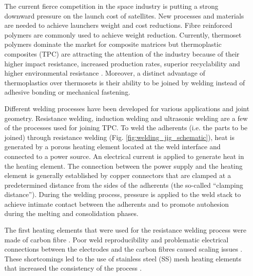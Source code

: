 \documentclass[11pt,review,times]{elsarticle}
\begin{document}
The current fierce competition in the space industry is putting a strong downward pressure on the launch cost of satellites. 
New processes and materials are needed to achieve launchers weight and cost reductions. 
Fibre reinforced polymers are commonly used to achieve weight reduction. 
Currently, thermoset polymers dominate the market for composite matrices but thermoplastic composites (TPC) are attracting the attention of the industry \cite{CompositeWorldSloan2018} because of their higher impact resistance, increased production rates, superior recyclability and higher environmental resistance \cite{cogswell1992}. 
Moreover, a distinct advantage of thermoplastics over thermosets is their ability to be joined by welding instead of adhesive bonding or mechanical fastening. 

Different welding processes have been developed for various applications and joint geometry. 
Resistance welding, induction welding and ultrasonic welding are a few of the processes used for joining TPC. 
To weld the adherents (i.e. the parts to be joined) through resistance welding (Fig. \ref{fig:welding_jig_schematic}), heat is generated by a porous heating element located at the weld interface and connected to a power source. 
An electrical current is applied to generate heat in the heating element. 
The connection between the power supply and the heating element is generally established by copper connectors that are clamped at a predetermined distance from the sides of the adherents (the so-called “clamping distance”). 
During the welding process, pressure is applied to the weld stack to achieve intimate contact between the adherents and to promote autohesion during the melting and consolidation phases. 

The first heating elements that were used for the resistance welding process were made of carbon fibre  \cite{Ageorges2000a,houghton1984bonding,Eveno1988}.
Poor weld reproducibility and problematic electrical connections between the electrodes and the carbon fibres caused scaling issues \cite{McKnight1997}. 
These shortcomings led to the use of stainless steel (SS) mesh heating elements that increased the consistency of the process \cite{Hou1999a}.
\end{document}
